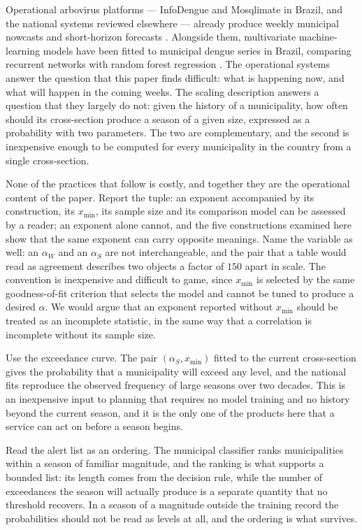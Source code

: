 \documentclass[english,10pt,b5paper]{article}
\begin{document}
Operational arbovirus platforms --- InfoDengue and Mosqlimate in Brazil, and the
national systems reviewed elsewhere --- already produce weekly municipal nowcasts
and short-horizon forecasts \citep{araujo2025large}. Alongside them, multivariate
machine-learning models have been fitted to municipal dengue series in Brazil,
comparing recurrent networks with random forest regression
\citep{mussumeci2020lstm}. The operational systems answer the question that this
paper finds difficult: what is happening now, and what will happen in the coming
weeks. The scaling description answers a question that they largely do not:
given the history of a municipality, how often should its cross-section produce a
season of a given size, expressed as a probability with two parameters. The two are
complementary, and the second is inexpensive enough to be computed for every
municipality in the country from a single cross-section.

None of the practices that follow is costly, and together they are the
operational content of the paper. Report the tuple: an exponent accompanied by
its construction, its $x_{\min}$, its sample size and its comparison model can
be assessed by a reader; an exponent alone cannot, and the five constructions
examined here show that the same exponent can carry opposite meanings. Name
the variable as well: an $\alpha_W$ and an $\alpha_S$ are not interchangeable,
and the pair that a table would read as agreement describes two objects a
factor of $150$ apart in scale. The convention is inexpensive and difficult to
game, since $x_{\min}$ is selected by the same goodness-of-fit criterion that
selects the model and cannot be tuned to produce a desired $\alpha$. We would
argue that an exponent reported without $x_{\min}$ should be treated as an
incomplete statistic, in the same way that a correlation is incomplete without
its sample size.

Use the exceedance curve. The pair $(\alpha_S, x_{\min})$ fitted to the
current cross-section gives the probability that a municipality will exceed any
level, and the national fits reproduce the observed frequency of large seasons
over two decades. This is an inexpensive input to planning that requires no model
training and no history beyond the current season, and it is the only one of the
products here that a service can act on before a season begins.

Read the alert list as an ordering. The municipal classifier ranks municipalities
within a season of familiar magnitude, and the ranking is what supports a bounded
list: its length comes from the decision rule, while the number of exceedances the
season will actually produce is a separate quantity that no threshold recovers. In
a season of a magnitude outside the training record the probabilities should not be
read as levels at all, and the ordering is what survives.
\end{document}
